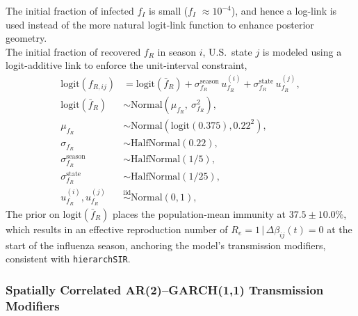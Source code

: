 \documentclass[11pt]{article}
\newcommand{\given}{\,|\,}
\newcommand{\Normal}{\text{Normal}}
\newcommand{\HalfNormal}{\text{HalfNormal}}
\begin{document}
The initial fraction of infected $f_I$ is small ($f_I$ $\approx 10^{-4}$), and hence a log-link is used instead of the more natural logit-link function to enhance posterior geometry.\\

The initial fraction of recovered $f_R$ in season $i$, U.S.\ state $j$ is modeled using a logit-additive link to enforce the unit-interval constraint,
\begin{align}\label{eq:f_R}
	\text{logit} \left( f_{R,ij} \right) &= \text{logit} \left(\bar{f}_R\right) + \sigma^{\text{season}}_{f_R}\, u^{(i)}_{f_R} + \sigma^{\text{state}}_{f_R}\, u^{(j)}_{f_R}, \nonumber\\
    \text{logit} \left(\bar{f}_R \right) &\sim \Normal\!\left(\mu_{f_R},\ \sigma_{f_R}^2\right), \nonumber\\
    \mu_{f_R} &\sim \Normal(\text{logit}(0.375), 0.22^2), \nonumber \\
    \sigma_{f_R} & \sim \HalfNormal(0.22), \nonumber \\
    \sigma^{\text{season}}_{f_R} &\sim \HalfNormal\!\left(1/5\right), \nonumber\\
    \sigma^{\text{state}}_{f_R} &\sim \HalfNormal\!\left(1/25\right), \nonumber\\
    u^{(i)}_{f_R}, u^{(j)}_{f_R} & \overset{\mathrm{iid}}{\sim}\Normal(0,1),
\end{align}
The prior on $\text{logit} \left(\bar{f}_R\right)$ places the population-mean immunity at $37.5\pm10.0\%$, which results in an effective reproduction number of $R_e = 1 \given \Delta \beta_{ij}(t) = 0$ at the start of the influenza season, anchoring the model's transmission modifiers, consistent with \texttt{hierarchSIR}.

\subsubsection*{Spatially Correlated AR(2)--GARCH(1,1) Transmission Modifiers}\label{sec:argarch}
\end{document}
